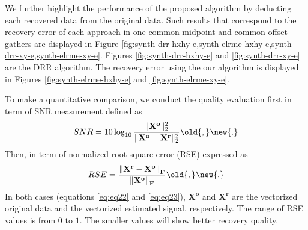 
We further highlight the performance of the proposed algorithm by deducting each recovered data from the original data. Such results that correspond to the recovery error of each approach in one common midpoint and common offset gathers are displayed in Figure \ref{fig:synth-drr-hxhy-e,synth-elrme-hxhy-e,synth-drr-xy-e,synth-elrme-xy-e}. Figures \ref{fig:synth-drr-hxhy-e} and \ref{fig:synth-drr-xy-e} are  the DRR algorithm. The recovery error using the our algorithm is displayed in Figures \ref{fig:synth-elrme-hxhy-e} and \ref{fig:synth-elrme-xy-e}.  


To make a quantitative comparison, we conduct the quality evaluation first in term of SNR measurement \citep{zhang2017hybrid} defined as\new{:}
\begin{equation}
SNR=10\log_{10}\frac{\Vert \mathbf{X^{o}} \Vert^2_2}{\Vert \mathbf{X^{o}}-\mathbf{X^{r}}\Vert^2_2}\old{,}\new{.}
\label{eq:eq22}
\end{equation}
Then, in term of normalized root square error (RSE) \citep{parekh2017improved} expressed as
\begin{equation}
RSE=\frac{\left\|\mathbf{X^r} - \mathbf{X^o}\right\|_\mathbf{F}}{\left\|\mathbf{X^o}\right\|_\mathbf{F}}\old{,}\new{.}
\label{eq:eq23}
\end{equation}
In both cases (equations \ref{eq:eq22} and \ref{eq:eq23}), $\mathbf{X^{o}}$ and $\mathbf{X^{r}}$ are the vectorized original data and the vectorized estimated signal, respectively. The range of RSE values is from $0$ to $1$. The smaller values will show better recovery quality.

